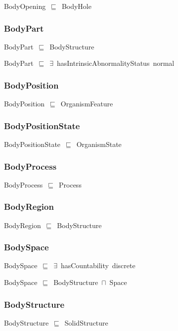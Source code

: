 \documentclass{article}
\begin{document}
BodyOpening~\ensuremath{\sqsubseteq}~BodyHole~

\subsubsection*{BodyPart}

BodyPart~\ensuremath{\sqsubseteq}~BodyStructure~

BodyPart~\ensuremath{\sqsubseteq}~\ensuremath{\exists}~hasIntrinsicAbnormalityStatus~normal~

\subsubsection*{BodyPosition}

BodyPosition~\ensuremath{\sqsubseteq}~OrganismFeature~

\subsubsection*{BodyPositionState}

BodyPositionState~\ensuremath{\sqsubseteq}~OrganismState~

\subsubsection*{BodyProcess}

BodyProcess~\ensuremath{\sqsubseteq}~Process~

\subsubsection*{BodyRegion}

BodyRegion~\ensuremath{\sqsubseteq}~BodyStructure~

\subsubsection*{BodySpace}

BodySpace~\ensuremath{\sqsubseteq}~\ensuremath{\exists}~hasCountability~discrete~

BodySpace~\ensuremath{\sqsubseteq}~BodyStructure~\ensuremath{\sqcap}~Space~

\subsubsection*{BodyStructure}

BodyStructure~\ensuremath{\sqsubseteq}~SolidStructure~
\end{document}
